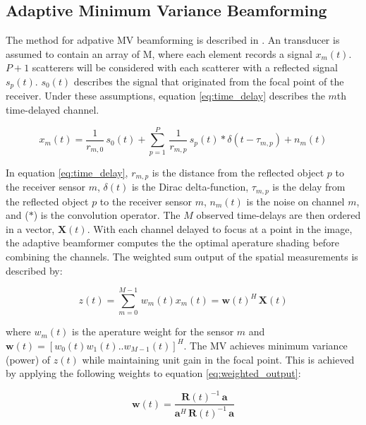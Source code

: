 \documentclass[journal]{IEEEtran}
\begin{document}
\subsection{Adaptive Minimum Variance Beamforming}

The method for adpative MV beamforming is described in \cite{synnevag2007adaptive}. An transducer is assumed to contain an array of M, where each element records a signal $x_m(t)$. $P+1$ scatterers will be considered with each scatterer with a reflected signal $s_p(t)$. $s_0(t)$ describes the signal that originated from the focal point of the receiver. Under these assumptions, equation \ref{eq:time_delay} describes the $m$th time-delayed channel.

    \begin{equation}\label{eq:time_delay}
    x_m(t) = \frac{1}{r_{m,0}} \, s_0(t) + \sum_{p=1}^{P} \, \frac{1}{r_{m,p}} \, s_p(t) * \delta(t - \tau_{m,p}) + n_m(t)
   \end{equation}
   
   In equation \ref{eq:time_delay}, $r_{m,p}$ is the distance from the reflected object $p$ to the receiver sensor $m$, $\delta(t)$ is the Dirac delta-function, $\tau_{m,p}$ is the delay from the reflected object $p$ to the receiver sensor $m$, $n_m(t)$ is the noise on channel $m$, and ($*$) is the convolution operator. The $M$ observed time-delays are then ordered in a vector, $\textbf{X}(t)$. With each channel delayed to focus at a point in the image, the adaptive beamformer computes the the optimal aperature shading before combining the channels. The weighted sum output of the spatial measurements is described by: 
   
    \begin{equation}\label{eq:weighted_output}
    z(t) = \sum_{m=0}^{M-1} \, w_m(t)x_m(t) = \textbf{w}(t)^H \, \textbf{X}(t)
   \end{equation}

    where $w_m(t)$ is the aperature weight for the sensor $m$ and $\textbf{w}(t) = [w_0(t) w_1(t) .. w_{M-1}(t)]^H$. The MV achieves minimum variance (power) of $z(t)$ while maintaining unit gain in the focal point. This is achieved by applying the following weights to equation \ref{eq:weighted_output}:  
    
    \begin{equation}\label{eq:weights}
    \textbf{w}(t) = \frac{\textbf{R}(t)^{-1} \, \textbf{a}}{\textbf{a}^H \, \textbf{R}(t)^{-1} \, \textbf{a}}
   \end{equation}
   
\end{document}
